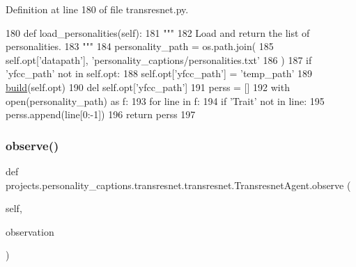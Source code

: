 Definition at line 180 of file transresnet.\+py.


\begin{DoxyCode}
180     \textcolor{keyword}{def }load\_personalities(self):
181         \textcolor{stringliteral}{"""}
182 \textcolor{stringliteral}{        Load and return the list of personalities.}
183 \textcolor{stringliteral}{        """}
184         personality\_path = os.path.join(
185             self.opt[\textcolor{stringliteral}{'datapath'}], \textcolor{stringliteral}{'personality\_captions/personalities.txt'}
186         )
187         \textcolor{keywordflow}{if} \textcolor{stringliteral}{'yfcc\_path'} \textcolor{keywordflow}{not} \textcolor{keywordflow}{in} self.opt:
188             self.opt[\textcolor{stringliteral}{'yfcc\_path'}] = \textcolor{stringliteral}{'temp\_path'}
189         \hyperlink{namespaceparlai_1_1mturk_1_1tasks_1_1talkthewalk_1_1download_a8c0fbb9b6dfe127cb8c1bd6e7c4e33fd}{build}(self.opt)
190         del self.opt[\textcolor{stringliteral}{'yfcc\_path'}]
191         perss = []
192         with open(personality\_path) \textcolor{keyword}{as} f:
193             \textcolor{keywordflow}{for} line \textcolor{keywordflow}{in} f:
194                 \textcolor{keywordflow}{if} \textcolor{stringliteral}{'Trait'} \textcolor{keywordflow}{not} \textcolor{keywordflow}{in} line:
195                     perss.append(line[0:-1])
196         \textcolor{keywordflow}{return} perss
197 
\end{DoxyCode}
\mbox{\label{classprojects_1_1personality__captions_1_1transresnet_1_1transresnet_1_1TransresnetAgent_af78a4624bcebdd216c6cb9325cf59a81}} 
\subsubsection{\texorpdfstring{observe()}{observe()}}
{\footnotesize\ttfamily def projects.\+personality\+\_\+captions.\+transresnet.\+transresnet.\+Transresnet\+Agent.\+observe (\begin{DoxyParamCaption}\item[{}]{self,  }\item[{}]{observation }\end{DoxyParamCaption})}


